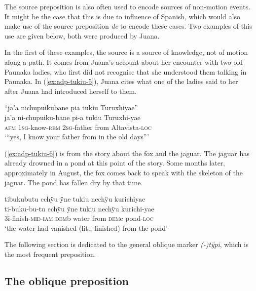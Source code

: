 The source preposition is also often used to encode sources of non-motion events. It might be the case that this is due to influence of Spanish, which would also make use of the source preposition \textit{de} to encode these cases. Two examples of this use are given below, both were produced by Juana.

In the first of these examples, the source is a source of knowledge, not of motion along a path. It comes from Juana’s account about her encounter with two old Paunaka ladies, who first did not recognise that she understood them talking in Paunaka. In (\ref{ex:adp-tukiu-5}), Juana cites what one of the ladies said to her after Juana had introduced herself to them.

\ea\label{ex:adp-tukiu-5}
\begingl
\glpreamble “ja'a nichupuikubane pia tukiu Turuxhiyae”\\
\gla ja'a ni-chupuiku-bane pi-a tukiu Turuxhi-yae\\
\glb \textsc{afm} 1\textsc{sg}-know-\textsc{rem} 2\textsc{sg}-father from Altavista-\textsc{loc} \\
\glft ‘“yes, I know your father from  in the old days”’
\endgl
\trailingcitation{[jxx-p120515l-1.134]}
\xe

(\ref{ex:adp-tukiu-6}) is from the story about the fox and the jaguar. The jaguar has already drowned in a pond at this point of the story. Some months later, approximately in August, the fox comes back to speak with the skeleton of the jaguar. The pond has fallen dry by that time.

\ea\label{ex:adp-tukiu-6}
\begingl
\glpreamble tibukubutu echÿu ÿne tukiu nechÿu kurichiyae\\
\gla ti-buku-bu-tu echÿu ÿne tukiu nechÿu kurichi-yae\\
\glb 3i-finish-\textsc{mid}-\textsc{iam} \textsc{dem}b water from \textsc{dem}c pond-\textsc{loc}\\
\glft ‘the water had vanished (lit.: finished) from the pond’
\endgl
\trailingcitation{[jmx-n120429ls-x5.283]}
\xe


The following section is dedicated to the general oblique marker \textit{(-)tÿpi}, which is the most frequent preposition.

\subsection{The oblique preposition}\label{sec:adp-tÿpi}

